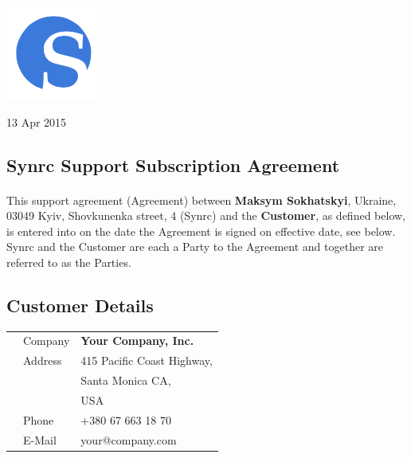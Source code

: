 \documentclass[11pt,oneside]{article}
\begin{document}
\begin{minipage}[t]{2cm}
\includegraphics[scale=0.4]{S}
\end{minipage}
\begin{minipage}[t]{12cm}
\begin{flushright}
\end{flushright}
\end{minipage}

\vspace{2\baselineskip}
13 Apr 2015
\vspace{5\baselineskip}
\begin{center}\subsection*{{\bf Synrc Support Subscription Agreement}}\end{center}

\paragraph{}
This support agreement (Agreement) between {\bf Maksym Sokhatskyi},
Ukraine, 03049 Kyiv, Shovkunenka street, 4 (Synrc) and the {\bf Customer},
as defined below, is entered into on the date the Agreement is signed on
effective date, see below. Synrc and the Customer are each a Party to the
Agreement and together are referred to as the Parties.
\vspace{3\baselineskip}

\subsection*{Customer Details}

\begin{tabular}{lll}
        & Company & {\bf Your Company, Inc.} \\
        & Address & 415 Pacific Coast Highway,  \\
        &         & Santa Monica CA, \\
        &         & USA \\
        & Phone   & +380 67 663 18 70 \\
        & E-Mail  & your@company.com \\
\end{tabular}
\end{document}
